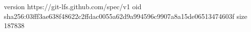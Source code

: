 version https://git-lfs.github.com/spec/v1
oid sha256:03fff3ae638f48622c2ffdac0055a62d9a994596c9907a8a15de06513474603f
size 187838
